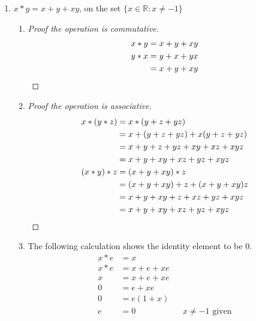 \documentclass[twoside]{amsart}
\newcommand{\Reals}{\mathbb{R}{}}
\begin{document}
\begin{enumerate}[A.]
\begin{enumerate}[1.]
\begin{enumerate}
	    \item The following calculation shows that the inverse of
	    $x$ is $4/x$.
	    \begin{align*}
	       x * x' & = 2             \\
	       x * x' & = \frac{xx'}{2} \\
		   2  & = \frac{xx'}{2} \\
		   4  & = xx'           \\
		   x' & = 4/x    && \text{$x \ne 0$ is given}
	    \end{align*}
	 \end{enumerate}

	 \item $x * y = x + y + xy$, on the set $\{x \in \Reals : x \ne -1\}$
	 \begin{enumerate}
	    \item
	    \begin{proof}[Proof the operation is commutative]
	       \begin{align*}
		  x * y & = x + y + xy \\
		  y * x & = y + x + yx \\
			& = x + y + xy \qedhere
	       \end{align*}
	    \end{proof}

	    \item
	    \begin{proof}[Proof the operation is associative]
	       \begin{align*}
		  x * (y * z) & = x * (y + z + yz) \\
			      & = x + (y + z + yz) + x(y + z + yz) \\
			      & = x + y + z + yz + xy + xz + xyz\\
			      & = x + y + xy + xz + yz + xyz \\
		  (x * y) * z & = (x + y + xy) * z \\
			      & = (x + y + xy) + z + (x + y + xy)z \\
			      & = x + y + xy + z + xz + yz + xyz \\
			      & = x + y + xy + xz + yz + xyz \qedhere
	       \end{align*}
	    \end{proof}

	    \item The following calculation shows the identity element to
	    be 0.
	    \begin{align*}
	       x * e & = x           \\
	       x * e & = x + e + xe  \\
		   x & = x + e + xe  \\
		   0 & =     e + xe  \\
		   0 & =   e(1 + x)  \\
		   e & = 0 && \text{$x\ne-1$ given}
	    \end{align*}


\end{enumerate}
\end{enumerate}
\end{enumerate}
\end{document}

